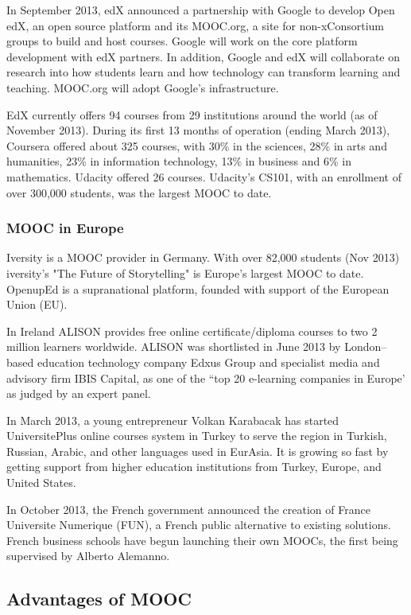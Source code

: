 In September 2013, edX announced a partnership with Google to develop Open edX,
an open source platform and its MOOC.org, a site for non-xConsortium groups to
build and host courses. Google will work on the core platform development with
edX partners. In addition, Google and edX will collaborate on research into how
students learn and how technology can transform learning and teaching. MOOC.org
will adopt Google's infrastructure.

EdX currently offers 94 courses from 29 institutions around the world (as of
November 2013). During its first 13 months of operation (ending March 2013),
Coursera offered about 325 courses, with 30\% in the sciences, 28\% in arts and
humanities, 23\% in information technology, 13\% in business and 6\% in
mathematics. Udacity offered 26 courses. Udacity's CS101, with an enrollment
of over 300,000 students, was the largest MOOC to date.

\subsubsection{MOOC in Europe}
Iversity is a MOOC provider in Germany. With over 82,000 students (Nov 2013)
iversity's "The Future of Storytelling" is Europe's largest MOOC to date.
OpenupEd is a supranational platform, founded with support of the European
Union (EU).

In Ireland ALISON provides free online certificate/diploma courses to two 2
million learners worldwide. ALISON was shortlisted in June 2013 by
London–based education technology company Edxus Group and specialist media and
advisory firm IBIS Capital, as one of the ``top 20 e-learning companies in
Europe' as judged by an expert panel.

In March 2013, a young entrepreneur Volkan Karabacak has started UniversitePlus
online courses system in Turkey to serve the region in Turkish, Russian, Arabic,
and other languages used in EurAsia. It is growing so fast by getting support
from higher education institutions from Turkey, Europe, and United States.

In October 2013, the French government announced the creation of France
Universite Numerique (FUN), a French public alternative to existing solutions.
French business schools have begun launching their own MOOCs, the first being
supervised by Alberto Alemanno.
\subsection{Advantages of MOOC}

